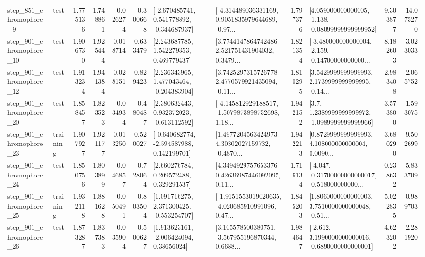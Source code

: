 \begin{tabular}{llrrrrllrlrr}
   step\_851\_chromophore\_9 &      test &      1.775136 &    1.748861 &     -0.026274 & -0.300668 &   [-2.670485741, 0.541778892, -0.344687937] &  [-4.314489036331169, 0.9051835979644689, -0.97... &       1.797376 &  [4.059000000000005, -1.138, -0.08099999999999952] &            9.303877 &         14.075270 \\
  step\_901\_chromophore\_10 &      test &      1.906730 &    1.925444 &      0.018714 &  0.633479 &     [2.243687785, 1.542279353, 0.469779437] &  [3.7744147864742486, 2.521751431904032, 0.3479... &       1.821354 &  [-3.480000000000004, -2.159, -0.14700000000000... &            8.182603 &          3.023033 \\
  step\_901\_chromophore\_12 &      test &      1.913234 &    1.941384 &      0.028151 &  0.829423 &    [2.236343965, 1.477043464, -0.204383904] &  [3.7425297315726778, 2.4770579921435094, -0.11... &       1.810295 &  [3.5429999999999993, 2.1739999999999995, -0.14... &            2.983408 &          2.065752 \\
  step\_901\_chromophore\_20 &      test &      1.858457 &    1.823523 &     -0.034934 & -0.480487 &    [2.380632443, 0.932372023, -0.613112592] &  [-4.145812929188517, -1.5079873898752698, 1.18... &       1.942152 &     [3.7, 1.2389999999999972, -1.0989999999999966] &            3.573800 &          1.593075 \\
  step\_901\_chromophore\_23 &  training &      1.907927 &    1.921177 &      0.013250 &  0.520027 &   [-0.640682774, -2.594587988, 0.142199701] &  [1.4977204563424973, 4.30302027159732, -0.4870... &       1.942213 &  [0.8729999999999993, 4.108000000000004, 0.0090... &            3.680290 &          9.502699 \\
  step\_901\_chromophore\_24 &      test &      1.850756 &    1.803899 &     -0.046857 & -0.728064 &     [2.660276784, 0.209572488, 0.329291537] &  [4.3494929757653376, 0.42636987446092095, 0.11... &       1.716134 &  [-4.047, -0.31700000000000017, -0.518000000000... &            0.238632 &          5.833709 \\
  step\_901\_chromophore\_25 &  training &      1.932118 &    1.881628 &     -0.050491 & -0.803504 &    [1.091716275, 2.371300425, -0.553254707] &  [-1.9151553019020635, -4.020685910991096, 0.47... &       1.845203 &  [1.8060000000000003, 3.7510000000000048, -0.51... &            5.022835 &          0.989703 \\
  step\_901\_chromophore\_26 &      test &      1.873287 &    1.837383 &     -0.035904 & -0.500627 &     [1.913623161, -2.006424094, 0.38656024] &  [3.105578500380751, -3.567955196870344, 0.6688... &       1.984647 &  [-2.612, 3.1990000000000016, -0.6890000000000001] &            4.623202 &          2.281920 \\

\end{tabular}
